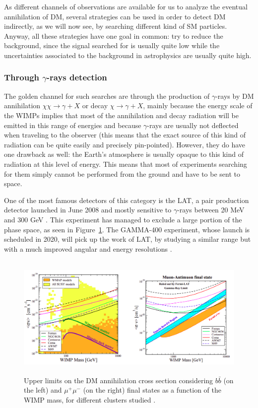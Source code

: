 \documentclass[a4paper, 10pt, openright]{report}
\begin{document}
As different channels of observations are available for us to analyze the eventual annihilation of \ac{DM}, several strategies can be used in order to detect \ac{DM} indirectly, as we will now see, by searching different kind of \ac{SM} particles. Anyway, all these strategies have one goal in common: try to reduce the background, since the signal searched for is usually quite low while the uncertainties associated to the background in astrophysics are usually quite high.

\subsubsection*{Through $\gamma$-rays detection}
The golden channel for such searches are through the production of $\gamma$-rays by \ac{DM} annihilation $\chi \chi \rightarrow \gamma + X$ or decay $\chi \rightarrow \gamma + X$, mainly because the energy scale of the \acp{WIMP} implies that most of the annihilation and decay radiation will be emitted in this range of energies and because $\gamma$-rays are usually not deflected when traveling to the observer (this means that the exact source of this kind of radiation can be quite easily and precisely pin-pointed). However, they do have one drawback as well: the Earth's atmosphere is usually opaque to this kind of radiation at this level of energy. This means that most of experiments searching for them simply cannot be performed from the ground and have to be sent to space. 

One of the most famous detectors of this category is the \ac{LAT}, a pair production detector launched in June 2008 and mostly sensitive to $\gamma$-rays between 20 MeV and 300 GeV \cite{LATExperiment}. This experiment has managed to exclude a large portion of the phase space, as seen in Figure~\ref{figure:LATExclusion}. The GAMMA-400 experiment, whose launch is scheduled in 2020, will pick up the work of \ac{LAT}, by studying a similar range but with a much improved angular and energy resolutions \cite{GAMMA400}. 

\begin{figure}[htbp]
\begin{center}
\includegraphics[width=12cm, height=6cm]{figs/LATExclusion.png}
\caption{Upper limits on the \ac{DM} annihilation cross section considering $b \bar b$ (on the left) and $\mu^+ \mu^-$ (on the right) final states as a function of the \ac{WIMP} mass, for different clusters studied \cite{LATExperiment}.}
\label{figure:LATExclusion}
\end{center}
\end{figure}
\end{document}
